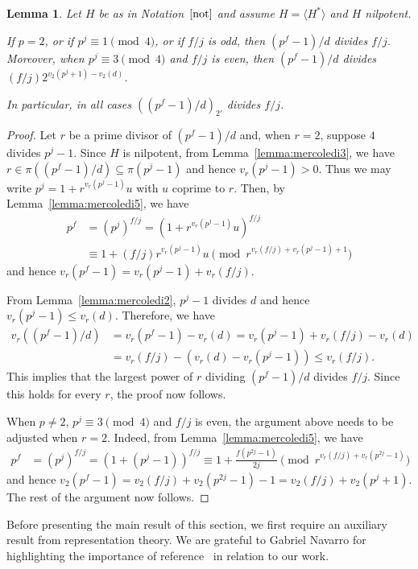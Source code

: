 \documentclass{amsart}
\newtheorem{lemma}[theorem]{Lemma}
\begin{document}
\begin{lemma}\label{lemma:mercoledi4}
Let $H$ be as in Notation~$\ref{not}$ and assume $H=\langle H^\ast\rangle$ and $H$  nilpotent. 

If $p=2$, or if $p^j\equiv 1\pmod 4$, or if $f/j$ is odd, then $(p^f-1)/d$ divides $f/j$.
Moreover, when $p^j\equiv 3\pmod 4$ and $f/j$ is even, then $(p^f-1)/d$ divides
$(f/j)2^{v_2(p^j+1)-v_2(d)}$.

In particular, in all cases $((p^f-1)/d)_{2'}$ divides $f/j$.
\end{lemma}
\begin{proof}
  Let $r$ be a prime divisor of $(p^f-1)/d$ and, when $r=2$, suppose $4$ divides $p^j-1$. Since $H$ is nilpotent, from Lemma~\ref{lemma:mercoledi3}, we have $r\in \pi((p^f-1)/d)\subseteq \pi(p^j-1)$ and hence $v_r(p^j-1)>0$. Thus we may write $p^j=1+r^{v_r(p^j-1)}u$ with $u$ coprime to $r$.
  Then, by Lemma~\ref{lemma:mercoledi5}, we have
\begin{align*}
p^f&=(p^j)^{f/j}=(1+r^{v_r(p^j-1)}u)^{f/j}\\
&\equiv 
1+(f/j)r^{v_r(p^j-1)}u\pmod{r^{v_r(f/j)+v_r(p^j-1)+1}}
\end{align*}
  and hence $v_r(p^f-1)=v_r(p^j-1)+v_r(f/j)$.

From Lemma~\ref{lemma:mercoledi2}, $p^j-1$ divides $d$ and hence $v_r(p^j-1)\le v_r(d)$. Therefore, we have
\begin{align*}
v_r((p^f-1)/d)&=v_r(p^f-1)-v_r(d)=v_r(p^j-1)+v_r(f/j)-v_r(d)\\
&=v_r(f/j)-(v_r(d)-v_r(p^j-1))\le v_r(f/j).
\end{align*}
This implies that the largest power of $r$ dividing $(p^f-1)/d$ divides $f/j$. Since this holds for every $r$, the proof now follows.

When $p\ne 2$, $p^j\equiv 3\pmod 4$ and $f/j$ is even, the argument above needs to be adjusted when $r=2$. Indeed, from  Lemma~\ref{lemma:mercoledi5}, we have
\begin{align*}
p^f&=(p^j)^{f/j}=(1+(p^j-1))^{f/j}\equiv 1+\frac{f(p^{2j}-1)}{2j}\pmod{r^{v_r(f/j)+v_r(p^{2j}-1)}}
\end{align*}
and hence $v_2(p^f-1)=v_2(f/j)+v_2(p^{2j}-1)-1=v_2(f/j)+v_2(p^j+1)$. The rest of the argument now follows.
\end{proof}

Before presenting the main result of this section, we first require an auxiliary result from representation theory. We are grateful to Gabriel Navarro for highlighting the importance of reference~\cite{Navarro} in relation to our work.
\end{document}

